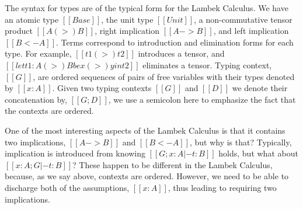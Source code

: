 The syntax for types are of the typical form for the Lambek Calculus.
We have an atomic type $[[Base]]$, the unit type $[[Unit]]$, a
non-commutative tensor product $[[A (>) B]]$, right implication $[[A
    -> B]]$, and left implication $[[B <- A]]$.  Terms correspond to
introduction and elimination forms for each type.  For example, $[[t1
    (>) t2]]$ introduces a tensor, and $[[let t1 : A (>) B be x (>) y
    in t2]]$ eliminates a tensor.  Typing context, $[[G]]$, are
ordered sequences of pairs of free variables with their types denoted
by $[[x : A]]$.  Given two typing contexts $[[G]]$ and $[[D]]$ we
denote their concatenation by, $[[G;D]]$, we use a semicolon here to
emphasize the fact that the contexts are ordered.

One of the most interesting aspects of the Lambek Calculus is that it
contains two implications, $[[A -> B]]$ and $[[B <- A]]$, but why is
that?  Typically, implication is introduced from knowing $[[G;x : A |-
    t : B]]$ holds, but what about $[[x : A;G |- t : B]]$?  These
happen to be different in the Lambek Calculus, because, as we say
above, contexts are ordered.  However, we need to be able to discharge
both of the assumptions, $[[x : A]]$, thus leading to requiring two
implications.  


